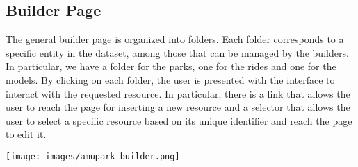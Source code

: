 \subsection{Builder Page}
The general builder page is organized into folders. Each folder corresponds to a specific entity in the dataset, among those that can be managed by the builders. In particular, we have a folder for the parks, one for the rides and one for the models. By clicking on each folder, the user is presented with the interface to interact with the requested resource. In particular, there is a link that allows the user to reach the page for inserting a new resource and a selector that allows the user to select a specific resource based on its unique identifier and reach the page to edit it.

\texttt{[image: images/amupark\_builder.png]}